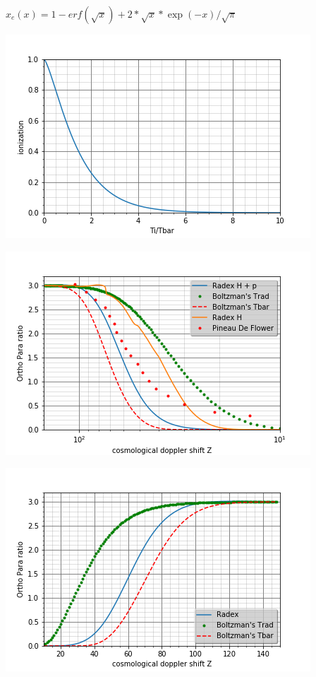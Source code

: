 \documentclass[12pt, a4paper]{article}
\begin{document}
\newpage

$x_e(x)=1-erf(\sqrt{x})+2*\sqrt{x}*\exp(-x)/\sqrt{\pi}$


\includegraphics{XE}

\includegraphics{rop}

\includegraphics{rop2}
\end{document}
